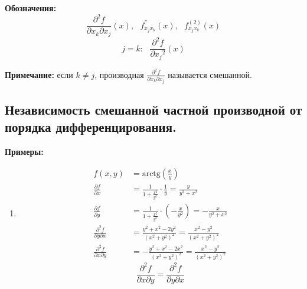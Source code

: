 \documentclass[a4paper,12pt]{article} %
\begin{document}
	\textbf{Обозначения:} 
	\[		
	\frac{\partial^2f}{\partial{x_k}\partial{x_j}}(x), \text{   } f^{''}_{x_jx_k}(x), \text{   } f^{(2)}_{x_jx_k}(x)
	\]
	\[
	j = k: \text{ }\frac{\partial^2f}{\partial{x_j}^2}(x)
	\]
	
	\textbf{Примечание:} если $k\neq j$, производная $\frac{\partial^2f}{\partial x_k\partial x_j}$ называется смешанной.
	
	\subsection{Независимость смешанной частной производной от порядка дифференцирования.}
	
	\textbf{Примеры:}
	
	\begin{enumerate}
		
		\item 
		\begin{align*}
			f(x, y) &= \text{arctg}\left(\frac{x}{y}\right)\\
			\frac{\partial{f}}{\partial{x}} &= \frac{1}{1+\frac{x^2}{y^2}}\cdot\frac{1}{y} = \frac{y}{y^2+x^2}\\
			\frac{\partial{f}}{\partial{y}} &= \frac{1}{1+\frac{x^2}{y^2}}\cdot\left(-\frac{x}{y^2}\right) = -\frac{x}{y^2+x^2}\\
			\frac{\partial^2f}{\partial{y}\partial{x}} &= \frac{y^2+x^2-2y^2}{(x^2+y^2)^2} = \frac{x^2-y^2}{(x^2+y^2)^2}\\
			\frac{\partial^2f}{\partial{x}\partial{y}} &= -\frac{y^2+x^2-2x^2}{(x^2+y^2)^2} = \frac{x^2-y^2}{(x^2+y^2)^2}
		\end{align*}
		\[
		\frac{\partial^2f}{\partial{x}\partial{y}} = \frac{\partial^2f}{\partial{y}\partial{x}}
		\]
		

\end{enumerate}
\end{document}
